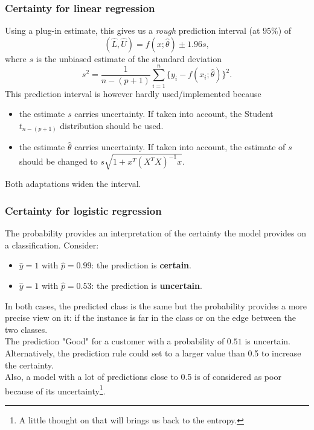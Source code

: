 \begin{frame}
\frametitle{Certainty for linear regression}
Using a plug-in estimate, this gives us a {\it rough} prediction interval (at $95\%$) of
$$
(\hat{L},\hat{U}) = f(x;\hat{\theta}) \pm 1.96 s, 
$$
where $s$ is the unbiased estimate of the standard deviation
$$
s^2 = \frac{1}{n-(p+1)} \sum_{i=1}^n \{y_i - f(x_i;\hat{\theta})\}^2.
$$
This prediction interval is however hardly used/implemented because
\begin{itemize}
\item the estimate $s$ carries uncertainty. If taken into account, the Student $t_{n-(p+1)}$ distribution should be used.
\item the estimate $\hat{\theta}$ carries uncertainty. If taken into account, the estimate of $s$ should be changed to $s \sqrt{1+x^T(X^TX)^{-1}x}$.
\end{itemize}
Both adaptations widen the interval. 
\end{frame}
\begin{frame}
\frametitle{Certainty for logistic regression}
The probability provides an interpretation of the certainty the model provides on a classification. Consider: 
\begin{itemize}
\item $\hat{y}=1$ with $\hat{p} = 0.99$: the prediction is {\bf certain}.
\item $\hat{y}=1$ with $\hat{p} = 0.53$: the prediction is {\bf uncertain}.
\end{itemize}
In both cases, the predicted class is the same but the probability provides a more precise view on it: if the instance is far in the class or on the edge between the two classes.\\
\vspace{0.2cm}
The prediction "Good" for a customer with a probability of $0.51$ is uncertain. Alternatively, the prediction rule could set to a larger value than 0.5 to increase the certainty. \\
\vspace{0.2cm}
Also, a model with a lot of predictions close to 0.5 is of considered as poor because of its uncertainty\footnote{A little thought on that will brings us back to the entropy.}.
\end{frame}
